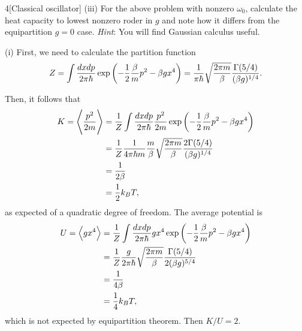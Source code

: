 \documentclass[12pt]{article}
\begin{document}
\begin{problem}{4}[Classical oscillator]
\qquad(iii) For the above problem with nonzero $\omega_0$, calculate the heat
capacity to lowest nonzero roder in $g$ and note how it differs from the
equipartition $g=0$ case. \textit{Hint}: You will find Gaussian calculus useful.
\begin{solution}
(i) First, we need to calculate the partition function
\begin{align}
    Z
    =\int\frac{dxdp}{2\pi\hbar}\exp\qty(-\frac12\frac\beta{m}p^2-\beta
    gx^4)
    =\frac1{\pi\hbar}\sqrt{\frac{2\pi m}{\beta}}\frac{\Gamma(5/4)}{(\beta
    g)^{1/4}}.
\end{align}

Then, it follows that
\begin{align}\label{p4bi:K}
    K=\expval{\frac{p^2}{2m}}
    &=\frac1Z\int\frac{dxdp}{2\pi\hbar}\frac{p^2}{2m}\exp\qty(-\frac12\frac\beta{m}p^2-\beta
    gx^4)\notag\\
    &=\frac1Z\frac{1}{4\pi\hbar m}\frac{m}{\beta}\sqrt{\frac{2\pi m}{\beta}}
    \frac{2\Gamma(5/4)}{(\beta g)^{1/4}}\notag\\
    &=\frac1{2\beta}\notag\\
    &=\frac12k_BT,
\end{align}
as expected of a quadratic degree of freedom. The average potential is
\begin{align}\label{p4bi:U}
    U=\expval{g x^4}
    &=\frac1Z\int\frac{dxdp}{2\pi\hbar}
    gx^4\exp\qty(-\frac12\frac\beta{m}p^2-\beta gx^4)\notag\\
    &=\frac1Z\frac{g}{2\pi\hbar}\sqrt{\frac{2\pi
    m}{\beta}}\frac{\Gamma(5/4)}{2(\beta g)^{5/4}}\notag\\
    &=\frac{1}{4\beta}\notag\\
    &=\frac14k_BT,
\end{align}
which is not expected by equipartition theorem. Then $K/U=2$.


\end{solution}
\end{problem}
\end{document}
